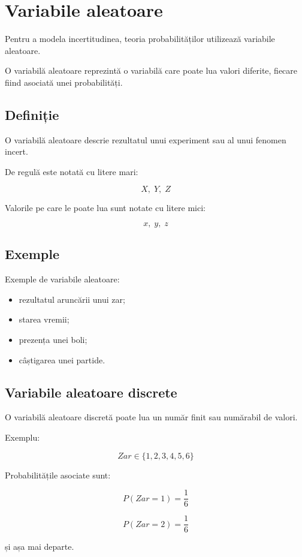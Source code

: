 \documentclass[12pt,a4paper]{article}
\begin{document}
\section{Variabile aleatoare}

Pentru a modela incertitudinea, teoria probabilităților utilizează variabile aleatoare.

O variabilă aleatoare reprezintă o variabilă care poate lua valori diferite, fiecare fiind asociată unei probabilități.

\subsection{Definiție}

O variabilă aleatoare descrie rezultatul unui experiment sau al unui fenomen incert.

De regulă este notată cu litere mari:

\[
X,\;Y,\;Z
\]

Valorile pe care le poate lua sunt notate cu litere mici:

\[
x,\;y,\;z
\]

\subsection{Exemple}

Exemple de variabile aleatoare:

\begin{itemize}
\item rezultatul aruncării unui zar;
\item starea vremii;
\item prezența unei boli;
\item câștigarea unei partide.
\end{itemize}

\subsection{Variabile aleatoare discrete}

O variabilă aleatoare discretă poate lua un număr finit sau numărabil de valori.

Exemplu:

\[
Zar \in \{1,2,3,4,5,6\}
\]

Probabilitățile asociate sunt:

\[
P(Zar=1)=\frac{1}{6}
\]

\[
P(Zar=2)=\frac{1}{6}
\]

și așa mai departe.
\end{document}
